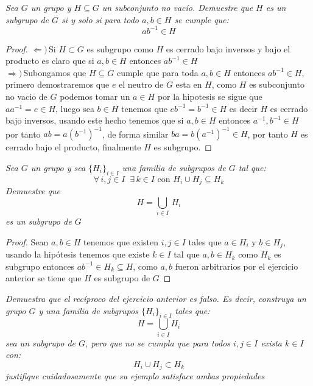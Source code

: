 \documentclass[11pt,letterpaper]{article}
\begin{document}
\begin{tcolorbox}[
	title = \textcolor{black}{\textcolor{white}{Problema 7}},]
\textit{Sea $G$ un grupo y $H\subseteq G$ un subconjunto no vac\'io. Demuestre que $H$ es un subgrupo de $G$ si y solo si para todo $a,b\in H$ se cumple que:
\begin{equation*}
    ab^{-1}\in H
\end{equation*}}
\end{tcolorbox} 
\begin{proof}
    $\Leftarrow)$\,Si $H\subset G$ es subgrupo como $H$ es cerrado bajo inversos y bajo el producto es claro que  si $a,b\in H$ entonces $ab^{-1}\in H$\,\\
    $\Rightarrow)$\,Subongamos que $H\subseteq G$ cumple que para toda $a,b\in H$ entonces $ab^{-1}\in H$, primero demostraremos que $e$ el neutro de $G$ esta en $H$,
    como $H$ es subconjunto no vacio de $G$ podemos tomar un $a\in H$ por la hipotesis se sigue que $aa^{-1}=e\in H$, luego sea $b\in H$ tenemos que $eb^{-1}=b^{-1}\in H$ es decir
    $H$ es cerrado bajo inversos, usando este hecho tenemos que si $a,b\in H$ entonces $a^{-1},b^{-1}\in H$ por tanto $ab=a(b^{-1})^{-1}$, de forma similar $ba=b(a^{-1})^{-1}\in H$, por tanto $H$ es
    cerrado bajo el producto, finalmente $H$ es subgrupo.  
\end{proof}
\begin{tcolorbox}[
	title = \textcolor{black}{\textcolor{white}{Problema 8}},]
\textit{Sea $G$ un grupo y sea $\{H_i\}_{i\in I}$ una familia de subgrupos de $G$ tal que:
\begin{equation*}
    \forall\,i,j\in I\,\,\:\exists\,k\in I\,\,\text{con}\,\,H_i\cup H_j\subseteq H_k
\end{equation*}
Demuestre que\,\\
\begin{equation*}
    H=\bigcup_{i\in I}\,H_i
\end{equation*}
es un subgrupo de $G$}
\end{tcolorbox}
\begin{proof}
    Sean $a,b\in H$ tenemos que existen $i,j\in I$ tales que $a\in H_i$ y $b\in H_j$, usando la hipótesis tenemos que existe $k\in I$ tal que $a,b\in H_k$ como $H_k$ es
    subgrupo entonces $ab^{-1}\in H_k\subseteq H$, como $a,b$ fueron arbitrarios por el ejercicio anterior se tiene que $H$ es subgrupo de $G$
\end{proof}
\newpage
\begin{tcolorbox}[
	title = \textcolor{black}{\textcolor{white}{Problema 9}},]
\textit{Demuestra que el rec\'iproco del ejercicio anterior es falso. Es decir, construya un grupo
$G$ y una familia de subgrupos $\{H_i\}_{i\in I}$ tales que:\,\\
\begin{equation*}
    H=\bigcup_{i\in I}H_i
\end{equation*}
sea un subgrupo de $G$, pero que no se cumpla que para todos $i,j\in I$ exista $k\in I$ con:
\begin{equation*}
    H_i\cup H_j\subset H_k
\end{equation*}
justifique cuidadosamente que su ejemplo satisface ambas propiedades
}
\end{tcolorbox}
\end{document}
